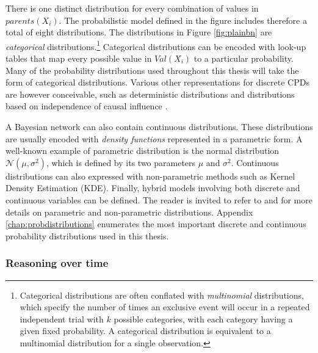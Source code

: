 
There is one distinct distribution for every combination of values in $parents(X_i)$. The probabilistic model defined in the figure includes therefore a total of eight distributions.  The distributions in Figure \ref{fig:plainbn} are \textit{categorical} distributions.\footnote{Categorical distributions are often conflated with \textit{multinomial} distributions, which specify the number of times an exclusive event will occur in a repeated independent trial with $k$ possible categories, with each category having a given fixed probability.  A categorical distribution is equivalent to a multinomial distribution for a single observation.} Categorical distributions can be encoded with look-up tables that map every possible value in $Val(X_i)$ to a particular probability.  Many of the probability distributions used throughout this thesis will take the form of categorical distributions. Various other representations for discrete CPDs are however conceivable, such as deterministic distributions and distributions based on independence of causal influence  \citep{diez06}. 

A Bayesian network can also contain continuous distributions.  These distributions are usually encoded with \textit{density functions} represented in a parametric form.  A well-known example of parametric distribution is the normal distribution $\mathcal{N}(\mu,\sigma^2)$, which is defined by its two parameters $\mu$ and $\sigma^2$. Continuous distributions can also expressed with non-parametric methods such as Kernel Density Estimation (KDE).  Finally, hybrid models involving both discrete and continuous variables can be defined.  The reader is invited to refer to \cite{Bishop:2006} and \cite{Koller+Friedman:09} for more details on parametric and non-parametric distributions.  Appendix \ref{chap:probdistributions} enumerates the most important discrete and continuous probability distributions used in this thesis. 

\subsubsection*{Reasoning over time}

